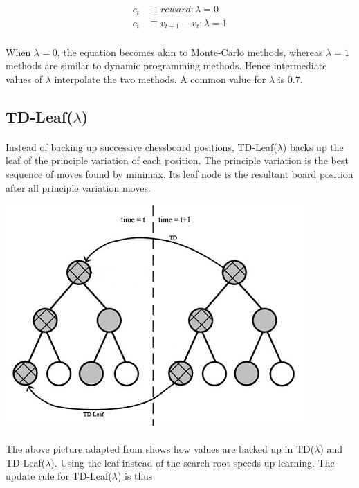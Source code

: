 \documentclass[12pt,a4paper]{book}
\begin{document}
\begin{align*}
  c_t &\equiv reward : \lambda = 0 \\
  c_t &\equiv v_{t+1} - v_t : \lambda = 1
\end{align*}

\paragraph{} When $\lambda = 0$, the equation becomes akin to Monte-Carlo methods, whereas $\lambda = 1$ methods are similar to dynamic programming methods. Hence intermediate values of $\lambda$ interpolate the two methods. A common value for $\lambda$ is 0.7. \cite{tdl}

\subsection{TD-Leaf($\lambda$)}

\paragraph{} Instead of backing up successive chessboard positions, TD-Leaf($\lambda$) backs up the leaf of the principle variation of each position. The principle variation is the best sequence of moves found by minimax. Its leaf node is the resultant board position after all principle variation moves.

\begin{center}
  \includegraphics[scale=0.75]{td.png}
\end{center}

\paragraph{} The above picture adapted from \cite{meep} shows how values are backed up in TD($\lambda$) and TD-Leaf($\lambda$). Using the leaf instead of the search root speeds up learning. The update rule for TD-Leaf($\lambda$) is thus
\end{document}
